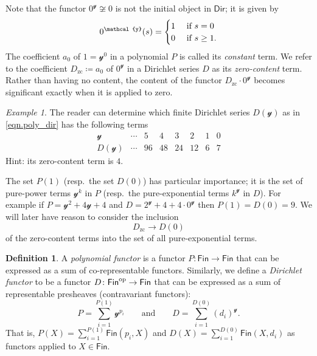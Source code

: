 \documentclass[11pt, article, one side]{memoir}
\theoremstyle{theorem}
\theoremstyle{definition}
\newtheorem{definition}[section]{Definition}
\theoremstyle{remark}
\newtheorem{example}[section]{Example}
\newcommand{\Cat}[1]{\mathsf{#1}}%
\newcommand{\op}{^\tn{op}}
\newcommand{\tn}[1]{\textnormal{#1}}
\newcommand{\finset}{\Cat{Fin}}
\newcommand{\zero}[1]{#1_\text{zc}}
\newcommand{\yon}{\mathcal{y}}
\newcommand{\dir}{\Cat{Dir}}
\newcommand{\mdot}{{\cdot}}
\newcommand{\qqand}{\qquad\text{and}\qquad}
\begin{document}
Note that the functor $0^\yon\not\cong 0$ is not the initial object in $\dir$; it is given by
\[
0^\yon(s)=
\begin{cases}
1&\tn{ if } s=0\\
0&\tn{ if } s\geq1.
\end{cases}
\]
The coefficient $a_0$ of $1=\yon^0$ in a polynomial $P$ is called its \emph{constant} term. We refer to the coefficient $\zero{D}\coloneqq a_0$ of $0^\yon$ in a Dirichlet series $D$ as its \emph{zero-content} term. Rather than having no content, the content of the functor $\zero{D}\mdot0^\yon$ becomes significant exactly when it is applied to zero.

\begin{example}
The reader can determine which finite Dirichlet series $D(\yon)$ as in \cref{eqn.poly_dir} has the following terms
\[
\begin{array}{c|ccccccc}
\yon&
\cdots&
5&
4&
3&
2&
1&
0
\\\hline
D(\yon)&
\cdots&
96&
48&
24&
12&
6&
7
\end{array}
\]
Hint: its zero-content term is $4$.
\end{example}

The set $P(1)$ (resp.\ the set $D(0)$) has particular importance; it is the set of pure-power terms $\yon^k$ in $P$ (resp.\ the pure-exponential terms $k^\yon$ in $D$). For example if $P=\yon^2+4\yon+4$ and $D=2^\yon+4+4\mdot0^\yon$ then $P(1)=D(0)=9$. We will later have reason to consider the inclusion
\begin{equation}\label{eqn.zerocontent}
\zero{D}\to D(0)
\end{equation}
of the zero-content terms into the set of all pure-exponential terms.

\begin{definition}
A \emph{polynomial functor} \cite{GK:Polynomial.Functors} is a functor $P\colon\finset\to\finset$ that can be expressed as a sum of co-representable functors. Similarly, we define a \emph{Dirichlet functor} to be a functor $D\colon\finset\op\to\finset$ that can be expressed as a sum of representable presheaves (contravariant functors):
\begin{equation}\label{eqn.finite_sum}
  P=\sum_{i=1}^{P(1)}\yon^{p_i}
  \qqand
  D=\sum_{i=1}^{D(0)}(d_i)^\yon.
\end{equation}
That is, $P(X)=\sum_{i=1}^{P(1)}\finset(p_i,X)$ and $D(X)=\sum_{i=1}^{D(0)}\finset(X,d_i)$ as functors applied to $X\in\finset$.
\end{definition}
\end{document}
